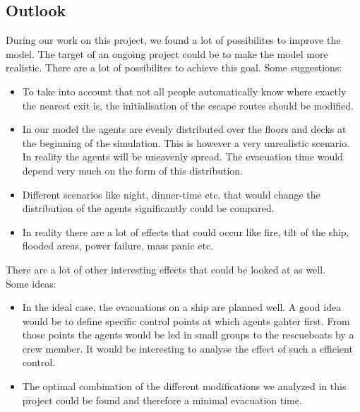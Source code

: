 \documentclass[11pt]{article}
\begin{document}
\subsection{Outlook}
During our work on this project, we found a lot of possibilites to improve the model. The target of an ongoing project could be to make the model more realistic. There are a lot of possibilites to achieve this goal.
\newline
Some suggestions:
\begin{itemize}
\item To take into account that not all people automatically know where exactly the nearest exit is, the initialisation of the escape routes should be modified.
\item In our model the agents are evenly distributed over the floors and decks at the beginning of the simulation. This is however a very unrealistic scenario. In reality the agents will be uneavenly spread. The evacuation time would depend very much on the form of this distribution.
\item Different scenarios like night, dinner-time etc. that would change the distribution of the agents significantly could be compared.
\item In reality there are a lot of effects that could occur like fire, tilt of the ship, flooded areas, power failure, mass panic etc.
\end{itemize}
There are a lot of other interesting effects that could be looked at as well.
\\
Some ideas:
\begin{itemize}
\item In the ideal case, the evacuations on a ship are planned well. A good idea would be to define specific control points at which agents gahter first. From those points the agents would be led in small groups to the rescueboats by a crew member. It would be interesting to analyse the effect of such a efficient control.
\item The optimal combination of the different modifications we analyzed in this project could be found and therefore a minimal evacuation time.
\end{itemize}
\end{document}
